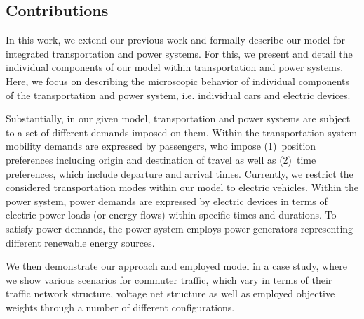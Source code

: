 \subsection{Contributions}
\label{contributions}

In this work, we extend our previous work and formally describe our model for integrated transportation and power systems. For this, we present and detail the individual components of our model within transportation and power systems. Here, we focus on describing the microscopic behavior of individual components of the transportation and power system, i.e. individual cars and electric devices.


Substantially, in our given model, transportation and power systems are subject to a set of different demands imposed on them. 
Within the transportation system mobility demands are expressed by passengers, who impose (1)~position preferences including origin and destination of travel as well as (2)~time preferences, which include departure and arrival times. Currently, we restrict the considered transportation modes within our model to electric vehicles.
Within the power system, power demands are expressed by electric devices in terms of electric power loads (or energy flows) within specific times and durations. To satisfy power demands, the power system employs power generators representing different renewable energy sources.

We then demonstrate our approach and employed model in a case study, where we show various scenarios for commuter traffic, which vary in terms of their traffic network structure, voltage net structure as well as employed objective weights through a number of different configurations.



